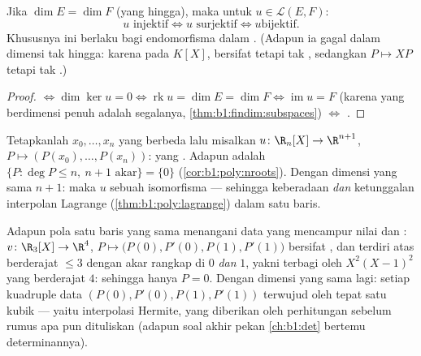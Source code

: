 \begin{corollary}\label{cor:b1:linmaps:samedim}
Jika $\dim E = \dim F$ (yang hingga), maka untuk $u \in \mathcal{L}(E, F)$:
\[
u \text{ injektif} \iff u \text{ surjektif} \iff u \text{
bijektif}.
\]
Khususnya ini berlaku bagi endomorfisma dalam . (Adapun ia
gagal dalam dimensi tak hingga: karena pada $K[X]$,  bersifat 
tetapi tak , sedangkan $P \mapsto XP$  tetapi tak
.)
\end{corollary}

\begin{proof}
 $\iff \dim\ker u = 0 \iff \operatorname{rk} u = \dim E =
\dim F \iff \operatorname{im} u = F$ (karena  yang berdimensi penuh
adalah segalanya, \cref{thm:b1:findim:subspaces}) $\iff$ .
\end{proof}

\begin{example}\label{ex:b1:linmaps:interpolation}
Tetapkanlah $x_0, \dots, x_n$ yang berbeda lalu misalkan $u \colon \R_n[X] \to
\R^{n+1}$, $P \mapsto (P(x_0), \dots, P(x_n))$: yang . Adapun 
adalah $\{P : \deg P \leq n,\ n+1 \text{ akar}\} = \{0\}$
(\cref{cor:b1:poly:nroots}). Dengan dimensi yang sama $n + 1$: maka $u$ sebuah
isomorfisma --- sehingga keberadaan \emph{dan} ketunggalan interpolan
Lagrange (\cref{thm:b1:poly:lagrange}) dalam satu baris.

Adapun pola satu baris yang sama menangani data yang mencampur nilai dan
: $v \colon \R_3[X] \to \R^4$, $P \mapsto \bigl(P(0),
P'(0), P(1), P'(1)\bigr)$ bersifat , dan  terdiri atas
 berderajat $\leq 3$ dengan akar rangkap di $0$ \emph{dan}
$1$, yakni terbagi oleh $X^2(X-1)^2$ yang berderajat $4$: sehingga hanya $P =
0$. Dengan dimensi yang sama lagi: setiap kuadruple data $(P(0),
P'(0), P(1), P'(1))$ terwujud oleh tepat satu kubik ---
yaitu interpolasi Hermite, yang diberikan oleh perhitungan  sebelum
rumus apa pun dituliskan (adapun soal akhir pekan \cref{ch:b1:det}
bertemu determinannya).
\end{example}

